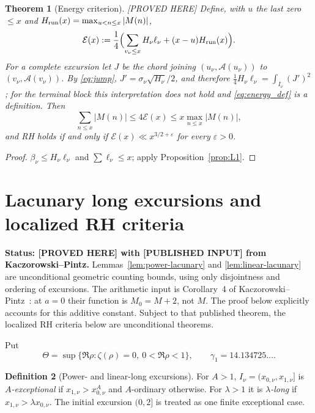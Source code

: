 \documentclass[11pt]{amsart}
\numberwithin{equation}{section}
\theoremstyle{plain}
\newtheorem{theorem}{Theorem}[section]
\theoremstyle{definition}
\newtheorem{definition}[theorem]{Definition}
\theoremstyle{remark}
\newcommand{\Anet}{\mathcal{A}}
\newcommand{\eps}{\varepsilon}
\newcommand{\En}{\mathcal{E}}
\begin{document}
\begin{theorem}[Energy criterion]
\label{thm:energy}
\emph{[PROVED HERE]} Define, with $u$ the last zero $\le x$ and
$H_{\rm run}(x)=\max_{u<n\le x}|M(n)|$,
\begin{equation}
\label{eq:energy_def}
  \En(x):=\frac14\Bigl(\sum_{v_\nu\le x}H_\nu\ell_\nu+(x-u)H_{\rm run}(x)\Bigr).
\end{equation}
For a complete excursion let $J$ be the chord joining
$(u_\nu,\Anet(u_\nu))$ to $(v_\nu,\Anet(v_\nu))$.  By
\eqref{eq:jump}, $J'=\sigma_\nu\sqrt{H_\nu}/2$, and therefore
$\tfrac14H_\nu\ell_\nu=\int_{I_\nu}(J')^2$; for the
terminal block this interpretation does not hold and \eqref{eq:energy_def} is
a definition. Then
\begin{equation}
\label{eq:energy_sandwich}
  \sum_{n\le x}|M(n)|\le4\En(x)\le x\max_{n\le x}|M(n)|,
\end{equation}
and RH holds if and only if $\En(x)\ll x^{3/2+\eps}$ for every $\eps>0$.
\end{theorem}

\begin{proof}
$\beta_\nu\le H_\nu\ell_\nu$ and $\sum\ell_\nu\le x$; apply
Proposition~\ref{prop:L1}.
\end{proof}


\section{Lacunary long excursions and localized RH criteria}
\label{sec:lacunary}

\noindent\textbf{Status: [PROVED HERE] with [PUBLISHED INPUT] from Kaczorowski--Pintz.} Lemmas~\ref{lem:power-lacunary} and
\ref{lem:linear-lacunary} are unconditional geometric counting bounds,
using only disjointness and ordering of excursions. The arithmetic input is
Corollary~4 of Kaczorowski--Pintz~\cite{KP86}: at $a=0$ their function is
$M_0=M+2$, not $M$. The proof below explicitly accounts for this additive
constant. Subject to that published theorem, the localized RH criteria below
are unconditional theorems.

Put
\[
\Theta=\sup\{\Re\rho:\zeta(\rho)=0,\ 0<\Re\rho<1\},\qquad
\gamma_1=14.134725\ldots .
\]

\begin{definition}[Power- and linear-long excursions]
For $A>1$, $I_\nu=(x_{0,\nu},x_{1,\nu}]$ is \emph{$A$-exceptional} if
$x_{1,\nu}>x_{0,\nu}^A$ and $A$-ordinary otherwise. For $\lambda>1$ it is
\emph{$\lambda$-long} if $x_{1,\nu}>\lambda x_{0,\nu}$. The initial
excursion $(0,2]$ is treated as one finite exceptional case.
\end{definition}
\end{document}
